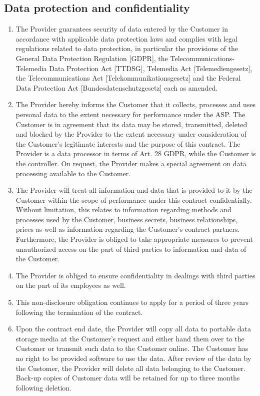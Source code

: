 \documentclass{terms}
\begin{document}
\subsection{Data protection and confidentiality}
\begin{enumerate}
\item The Provider guarantees security of data entered by the Customer in accordance with applicable data protection laws and complies with legal regulations related to data protection, in particular the provisions of the General Data Protection Regulation [GDPR], the Telecommunications-Telemedia Data Protection Act [TTDSG], Telemedia Act [Telemediengesetz], the Telecommunications Act [Telekommunikationsgesetz] and the Federal Data Protection Act [Bundesdatenschutzgesetz] each as amended.
\item The Provider hereby informs the Customer that it collects, processes and uses personal data to the extent necessary for performance under the ASP. The Customer is in agreement that its data may be stored, transmitted, deleted and blocked by the Provider to the extent necessary under consideration of the Customer's legitimate interests and the purpose of this contract. The Provider is a data processor in terms of Art. 28 GDPR, while the Customer is the controller. On request, the Provider makes a special agreement on data processing available to the Customer.
\item The Provider will treat all information and data that is provided to it by the Customer within the scope of performance under this contract confidentially. Without limitation, this relates to information regarding methods and processes used by the Customer, business secrets, business relationships, prices as well as information regarding the Customer's contract partners. Furthermore, the Provider is obliged to take appropriate measures to prevent unauthorized access on the part of third parties to information and data of the Customer.
\item The Provider is obliged to ensure confidentiality in dealings with third parties on the part of its employees as well.
\item This non-disclosure obligation continues to apply for a period of three years following the termination of the contract. 
\item Upon the contract end date, the Provider will copy all data to portable data storage media at the Customer's request and either hand them over to the Customer or transmit such data to the Customer online. The Customer has no right to be provided software to use the data. After review of the data by the Customer, the Provider will delete all data belonging to the Customer. Back-up copies of Customer data will be retained for up to three months following deletion.

\end{enumerate}
\end{document}
